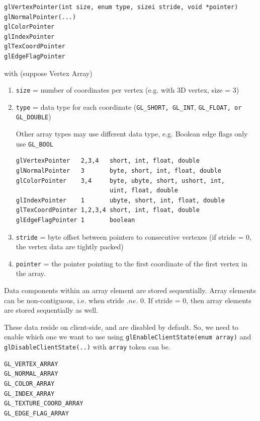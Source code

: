 \begin{verbatim}
glVertexPointer(int size, enum type, sizei stride, void *pointer)
glNormalPointer(...)
glColorPointer
glIndexPointer
glTexCoordPointer
glEdgeFlagPointer
\end{verbatim}
with (suppose Vertex Array)
\begin{enumerate}
\item \verb!size! = number of coordinates per vertex (e.g. with 3D
  vertex, size = 3)
\item \verb!type! = data type for each coordinate
  (\verb!GL_SHORT, GL_INT!, \verb!GL_FLOAT, or GL_DOUBLE!)

  Other array types may use different data type, e.g. Boolean edge
  flags only use \verb!GL_BOOL!
\begin{verbatim}
glVertexPointer   2,3,4   short, int, float, double
glNormalPointer   3       byte, short, int, float, double
glColorPointer 	  3,4     byte, ubyte, short, ushort, int,  
                          uint, float, double 
glIndexPointer    1       ubyte, short, int, float, double
glTexCoordPointer 1,2,3,4 short, int, float, double
glEdgeFlagPointer 1       boolean
\end{verbatim}

\item \verb!stride! = byte offset between pointers to consecutive
  vertexes (if stride = 0, the vertex data are tightly packed)
\item \verb!pointer! = the pointer pointing to the first coordinate of
  the first vertex in the array. 
\end{enumerate}

\begin{framed}
  Data components within an array element are stored
  sequentially. Array elements can be non-contiguous, i.e. when stride
  $.ne.$ 0. If stride = 0, then array elements are stored sequentially
  as well. 
\end{framed}


These data reside on client-side, and are disabled by default. So, we
need to enable which one we want to use using
\verb!glEnableClientState(enum array)! and
\verb!glDisableClientState(..)!  with \verb!array! token can be.
\begin{verbatim}
GL_VERTEX_ARRAY
GL_NORMAL_ARRAY
GL_COLOR_ARRAY
GL_INDEX_ARRAY
GL_TEXTURE_COORD_ARRAY
GL_EDGE_FLAG_ARRAY
\end{verbatim}

